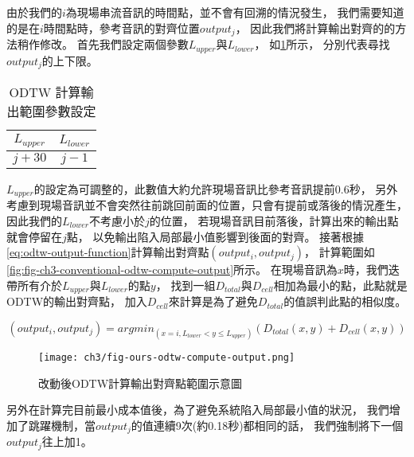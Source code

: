 \documentclass[class=NCU_thesis, crop=false]{standalone}
\begin{document}
由於我們的$i$為現場串流音訊的時間點，並不會有回溯的情況發生，
我們需要知道的是在$i$時間點時，參考音訊的對齊位置$output_j$，
因此我們將計算輸出對齊的的方法稍作修改。
首先我們設定兩個參數$L_{upper}$與$L_{lower}$，
如\cref{table:table-odtw-compute-outputj-parameter-setting}所示，
分別代表尋找$output_j$的上下限。
\begin{table}[h]
    \centering
    \caption{ODTW 計算輸出範圍參數設定}
    \label{table:table-odtw-compute-outputj-parameter-setting}
    \begin{tabular}{|c|c|}
        \hline
        \multicolumn{1}{|c|}{$L_{upper}$} & \multicolumn{1}{|c|}{$L_{lower}$}\\
        \hline
        $j+30$ & $j-1$ \\
        \hline
    \end{tabular}
\end{table}
$L_{upper}$的設定為可調整的，此數值大約允許現場音訊比參考音訊提前0.6秒，
另外考慮到現場音訊並不會突然往前跳回前面的位置，只會有提前或落後的情況產生，
因此我們的$L_{lower}$不考慮小於$j$的位置，
若現場音訊目前落後，計算出來的輸出點就會停留在$j$點，
以免輸出陷入局部最小值影響到後面的對齊。
接著根據\cref{eq:odtw-output-function}計算輸出對齊點$(output_i, output_j)$，
計算範圍如\cref{fig:fig-ch3-conventional-odtw-compute-output}所示。
在現場音訊為$x$時，我們迭帶所有介於$L_{upper}$與$L_{lower}$的點$y$，
找到一組$D_{total}$與$D_{cell}$相加為最小的點，此點就是ODTW的輸出對齊點，
加入$D_{cell}$來計算是為了避免$D_{total}$的值誤判此點的相似度。

\begin{equation} 
    \label{eq:odtw-output-function}
    (output_i, output_j) = argmin_{(x=i, L_{lower} < y \leq L_{upper})}(D_{total}(x,y)+D_{cell}(x,y))
\end{equation}

\begin{figure}[H]
    \centering
    \texttt{[image: ch3/fig-ours-odtw-compute-output.png]}
    \caption{改動後ODTW計算輸出對齊點範圍示意圖}
    \label{fig:fig-ch3-ours-odtw-compute-output}
\end{figure}

另外在計算完目前最小成本值後，為了避免系統陷入局部最小值的狀況，
我們增加了跳躍機制，當$output_j$的值連續9次(約0.18秒)都相同的話，
我們強制將下一個$output_j$往上加1。
\end{document}
